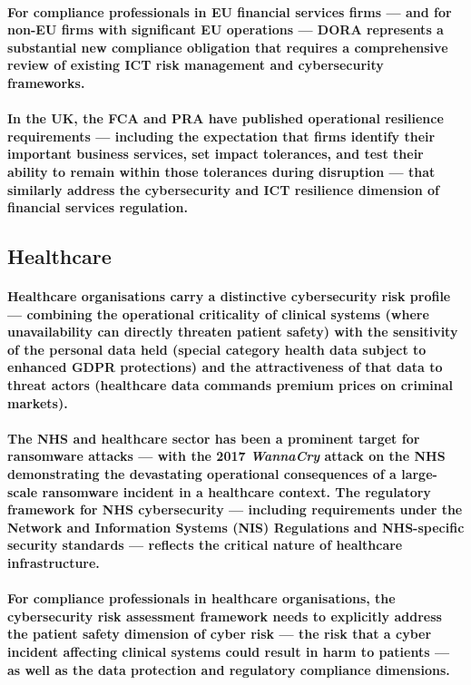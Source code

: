 \paragraph{For compliance professionals in EU financial services firms — and for non-EU firms with significant EU operations — DORA represents a substantial new compliance obligation that requires a comprehensive review of existing ICT risk management and cybersecurity frameworks.}
\paragraph{In the UK, the FCA and PRA have published operational resilience requirements — including the expectation that firms identify their important business services, set impact tolerances, and test their ability to remain within those tolerances during disruption — that similarly address the cybersecurity and ICT resilience dimension of financial services regulation.}

\subsection{Healthcare}
\paragraph{Healthcare organisations carry a distinctive cybersecurity risk profile — combining the operational criticality of clinical systems (where unavailability can directly threaten patient safety) with the sensitivity of the personal data held (special category health data subject to enhanced GDPR protections) and the attractiveness of that data to threat actors (healthcare data commands premium prices on criminal markets).}
\paragraph{The \textbf{NHS and healthcare sector} has been a prominent target for ransomware attacks — with the 2017 \textbf{\textit{WannaCry}} attack on the NHS demonstrating the devastating operational consequences of a large-scale ransomware incident in a healthcare context. The regulatory framework for NHS cybersecurity — including requirements under the \textbf{Network and Information Systems (NIS) Regulations} and NHS-specific security standards — reflects the critical nature of healthcare infrastructure.}
\paragraph{For compliance professionals in healthcare organisations, the cybersecurity risk assessment framework needs to explicitly address the patient safety dimension of cyber risk — the risk that a cyber incident affecting clinical systems could result in harm to patients — as well as the data protection and regulatory compliance dimensions.}

